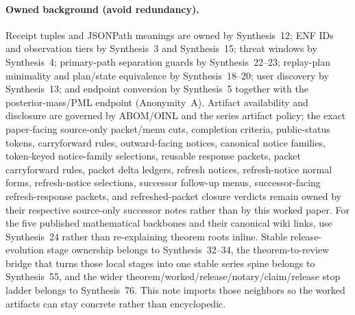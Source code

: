 \documentclass[11pt]{article}
\begin{document}
\paragraph{Owned background (avoid redundancy).}
Receipt tuples and JSONPath meanings are owned by Synthesis~12; ENF IDs and observation tiers by Synthesis~3 and Synthesis~15; threat windows by Synthesis~4; primary-path separation guards by Synthesis~22--23; replay-plan minimality and plan/state equivalence by Synthesis~18--20; user discovery by Synthesis~13; and endpoint conversion by Synthesis~5 together with the posterior-mass/PML endpoint (Anonymity~A).\cite{series:receiptitems,series:traceifaces,series:tieredobs,series:threatwindows,series:primarysepmanifest,series:probsep,series:planstateequiv,series:auditorreplay,series:userminiface,series:endpointbridge,series:oddsinflation}
Artifact availability and disclosure are governed by ABOM/OINL and the series artifact policy; the exact paper-facing source-only packet/menu cuts, completion criteria, public-status tokens, carryforward rules, outward-facing notices, canonical notice families, token-keyed notice-family selections, reusable response packets, packet carryforward rules, packet delta ledgers, refresh notices, refresh-notice normal forms, refresh-notice selections, successor follow-up menus, successor-facing refresh-response packets, and refreshed-packet closure verdicts remain owned by their respective source-only successor notes rather than by this worked paper.\cite{series:abomoinl,series:artifactpolicy,series:publicrequestcontracts,series:requestableevidenceclasses,series:requestfulfillmentcertificates,series:publicrequeststatusenvelopes,series:publicrequestcarryforward,series:publicrequestnotices,series:publicrequestnoticenormalforms,series:publicrequestnoticeselections,series:publicrequestresponsepackets,series:publicrequestresponsepacketcarryforward,series:publicrequestresponsepacketdeltas,series:publicrequestresponsepacketrefreshnotices,series:publicrequestresponsepacketrefreshnoticenormalforms,series:publicrequestresponsepacketrefreshnoticeselections,series:publicrequestresponsepacketrefreshresponsemenus,series:publicrequestresponsepacketrefreshresponsepackets,series:publicrequestresponsepacketrefreshresponsepacketclosureverdicts}
For the five published mathematical backbones and their canonical wiki links, use Synthesis~24 rather than re-explaining theorem roots inline. Stable release-evolution stage ownership belongs to Synthesis~32--34, the theorem-to-review bridge that turns those local stages into one stable series spine belongs to Synthesis~55, and the wider theorem/worked/release/notary/claim/release stop ladder belongs to Synthesis~76. This note imports those neighbors so the worked artifacts can stay concrete rather than encyclopedic.\cite{series:mathcrosswalk,series:releasespine,series:releaseclosure,series:statusenvelopes,series:seriesspines,series:theoremtopublicationspine}
\end{document}
